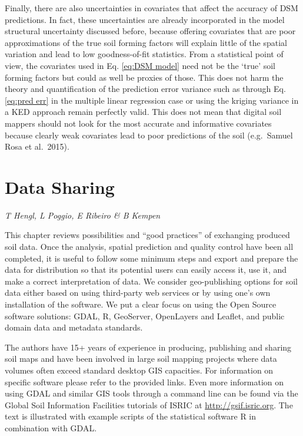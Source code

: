 \documentclass[10pt,b5paper,]{book}
\theoremstyle{definition}
\theoremstyle{definition}
\theoremstyle{definition}
\theoremstyle{remark}
\begin{document}
Finally, there are also uncertainties in covariates that affect the
accuracy of DSM predictions. In fact, these uncertainties are already
incorporated in the model structural uncertainty discussed before,
because offering covariates that are poor approximations of the true
soil forming factors will explain little of the spatial variation and
lead to low goodness-of-fit statistics. From a statistical point of
view, the covariates used in Eq. \ref{eq:DSM model} need not be the
`true' soil forming factors but could as well be proxies of those. This
does not harm the theory and quantification of the prediction error
variance such as through Eq. \ref{eq:pred err} in the multiple linear
regression case or using the kriging variance in a KED approach remain
perfectly valid. This does not mean that digital soil mappers should not
look for the most accurate and informative covariates because clearly
weak covariates lead to poor predictions of the soil (e.g.~Samuel Rosa
et al.~2015).

\hypertarget{data-sharing}{%
\chapter{Data Sharing}\label{data-sharing}}

\emph{T Hengl, L Poggio, E Ribeiro \& B Kempen}

This chapter reviews possibilities and ``good practices'' of exchanging
produced soil data. Once the analysis, spatial prediction and quality
control have been all completed, it is useful to follow some minimum
steps and export and prepare the data for distribution so that its
potential users can easily access it, use it, and make a correct
interpretation of data. We consider geo-publishing options for soil data
either based on using third-party web services or by using one's own
installation of the software. We put a clear focus on using the Open
Source software solutions: GDAL, R, GeoServer, OpenLayers and Leaflet,
and public domain data and metadata standards.

The authors have 15+ years of experience in producing, publishing and
sharing soil maps and have been involved in large soil mapping projects
where data volumes often exceed standard desktop GIS capacities. For
information on specific software please refer to the provided links.
Even more information on using GDAL and similar GIS tools through a
command line can be found via the Global Soil Information Facilities
tutorials of ISRIC at \url{http://gsif.isric.org}. The text is
illustrated with example scripts of the statistical software R in
combination with GDAL.
\end{document}

